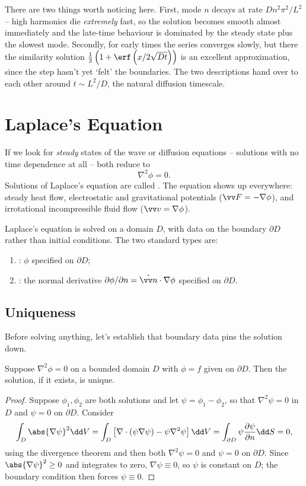 There are two things worth noticing here. First, mode $n$ decays at rate $D n^2 \pi^2/L^2$ -- high harmonics die \emph{extremely} fast, so the solution becomes smooth almost immediately and the late-time behaviour is dominated by the steady state plus the slowest mode. Secondly, for early times the series converges slowly, but there the similarity solution $\frac{1}{2}\left(1 + \erf \left(x/2\sqrt{Dt}\right)\right)$ is an excellent approximation, since the step hasn't yet `felt' the boundaries. The two descriptions hand over to each other around $t \sim L^2/D$, the natural diffusion timescale.

\section{Laplace's Equation}

If we look for \emph{steady} states of the wave or diffusion equations -- solutions with no time dependence at all -- both reduce to 
$$
\nabla^2 \phi = 0.
$$
Solutions of Laplace's equation are called . The equation shows up everywhere: steady heat flow, electrostatic and gravitational potentials ($\vv F = -\nabla \phi$), and irrotational incompressible fluid flow ($\vv v = \nabla \phi$).

Laplace's equation is solved on a domain $D$, with data on the boundary $\partial D$ rather than initial conditions. The two standard types are:
\begin{enumerate}[label=(\roman*)]
    \item {}: $\phi$ specified on $\partial D$;
    \item {}: the normal derivative $\partial \phi / \partial n = \hat{\vv n} \cdot \nabla \phi$ specified on $\partial D$.
\end{enumerate}

\subsection{Uniqueness}

Before solving anything, let's establish that boundary data pins the solution down.

\begin{theorem}
    Suppose $\nabla^2 \phi = 0$ on a bounded domain $D$ with $\phi = f$ given on $\partial D$. Then the solution, if it exists, is unique.
\end{theorem}
\begin{proof}
    Suppose $\phi_1, \phi_2$ are both solutions and let $\psi = \phi_1 - \phi_2$, so that $\nabla^2 \psi = 0$ in $D$ and $\psi = 0$ on $\partial D$.
    Consider
    $$
    \int_D \abs{\nabla \psi}^2 \dd V = \int_D \left[\nabla \cdot (\psi \nabla \psi) - \psi \nabla^2 \psi \right]\dd V = \int_{\partial D} \psi \frac{\partial \psi}{\partial n} \dd S = 0,
    $$
    using the divergence theorem and then both $\nabla^2 \psi = 0$ and $\psi = 0$ on $\partial D$.
    Since $\abs{\nabla \psi}^2 \geq 0$ and integrates to zero, $\nabla \psi \equiv 0$, so $\psi$ is constant on $D$; the boundary condition then forces $\psi \equiv 0$.
\end{proof}

